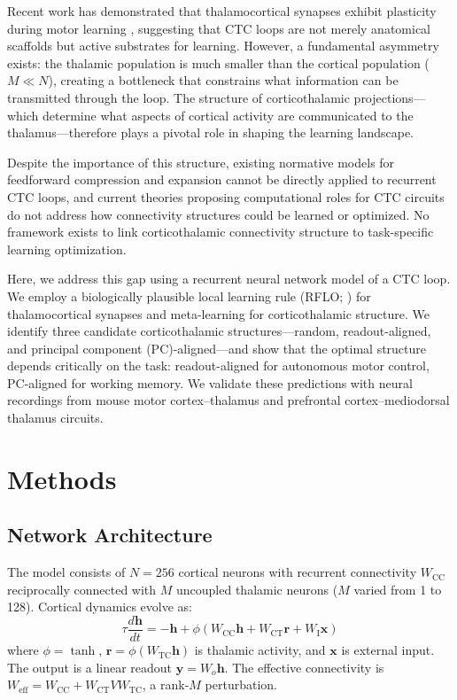\documentclass[11pt]{article}
\begin{document}
Recent work has demonstrated that thalamocortical synapses exhibit plasticity during motor learning \citep{biane2016thalamocortical}, suggesting that CTC loops are not merely anatomical scaffolds but active substrates for learning. However, a fundamental asymmetry exists: the thalamic population is much smaller than the cortical population ($M \ll N$), creating a bottleneck that constrains what information can be transmitted through the loop. The structure of corticothalamic projections---which determine what aspects of cortical activity are communicated to the thalamus---therefore plays a pivotal role in shaping the learning landscape.

Despite the importance of this structure, existing normative models for feedforward compression and expansion \citep{saxena2019towards} cannot be directly applied to recurrent CTC loops, and current theories proposing computational roles for CTC circuits \citep{logiaco2021thalamic, kao2021optimal} do not address how connectivity structures could be learned or optimized. No framework exists to link corticothalamic connectivity structure to task-specific learning optimization.

Here, we address this gap using a recurrent neural network model of a CTC loop. We employ a biologically plausible local learning rule (RFLO; \citealt{murray2019local}) for thalamocortical synapses and meta-learning \citep{finn2017model, hospedales2022meta} for corticothalamic structure. We identify three candidate corticothalamic structures---random, readout-aligned, and principal component (PC)-aligned---and show that the optimal structure depends critically on the task: readout-aligned for autonomous motor control, PC-aligned for working memory. We validate these predictions with neural recordings from mouse motor cortex--thalamus and prefrontal cortex--mediodorsal thalamus circuits.

\section{Methods}

\subsection{Network Architecture}

The model consists of $N = 256$ cortical neurons with recurrent connectivity $W_{\text{CC}}$ reciprocally connected with $M$ uncoupled thalamic neurons ($M$ varied from 1 to 128). Cortical dynamics evolve as:
\begin{equation}
\tau \frac{d\mathbf{h}}{dt} = -\mathbf{h} + \phi(W_{\text{CC}} \mathbf{h} + W_{\text{CT}} \mathbf{r} + W_{\text{I}} \mathbf{x})
\end{equation}
where $\phi = \tanh$, $\mathbf{r} = \phi(W_{\text{TC}} \mathbf{h})$ is thalamic activity, and $\mathbf{x}$ is external input. The output is a linear readout $\mathbf{y} = W_o \mathbf{h}$. The effective connectivity is $W_{\text{eff}} = W_{\text{CC}} + W_{\text{CT}} V W_{\text{TC}}$, a rank-$M$ perturbation.
\end{document}
